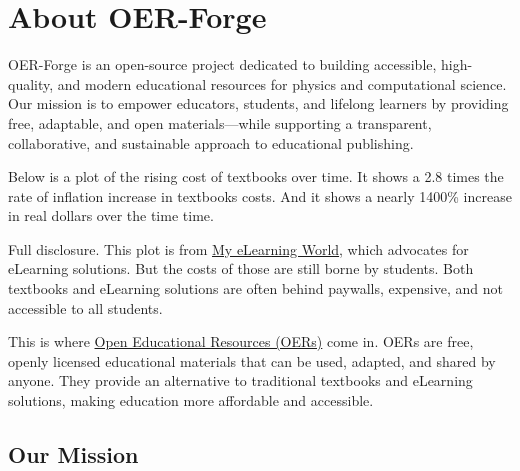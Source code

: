 \section{About OER-Forge}\label{about-oer-forge}

OER-Forge is an open-source project dedicated to building accessible,
high-quality, and modern educational resources for physics and
computational science. Our mission is to empower educators, students,
and lifelong learners by providing free, adaptable, and open
materials---while supporting a transparent, collaborative, and
sustainable approach to educational publishing.

Below is a plot of the rising cost of textbooks over time. It shows a
2.8 times the rate of inflation increase in textbooks costs. And it
shows a nearly 1400\% increase in real dollars over the time time.

Full disclosure. This plot is from
\href{https://myelearningworld.com/textbook-prices-vs-inflation/}{My
eLearning World}, which advocates for eLearning solutions. But the costs
of those are still borne by students. Both textbooks and eLearning
solutions are often behind paywalls, expensive, and not accessible to
all students.

This is where
\href{https://en.wikipedia.org/wiki/Open_educational_resources}{Open
Educational Resources (OERs)} come in. OERs are free, openly licensed
educational materials that can be used, adapted, and shared by anyone.
They provide an alternative to traditional textbooks and eLearning
solutions, making education more affordable and accessible.

\subsection{Our Mission}\label{our-mission}

